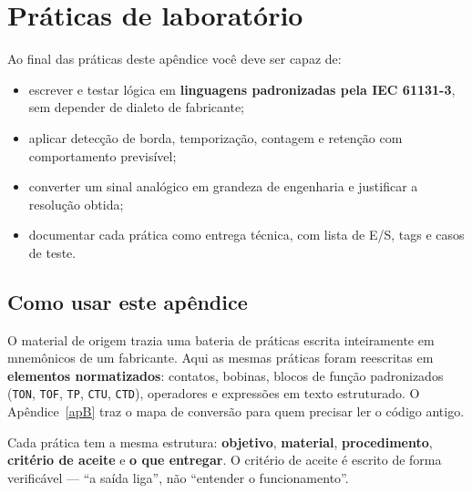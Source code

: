 \chapter{Práticas de laboratório}
\label{apA}

\begin{objetivos}
Ao final das práticas deste apêndice você deve ser capaz de:
\begin{itemize}
  \item escrever e testar lógica em \textbf{linguagens padronizadas pela IEC 61131-3}, sem depender de
        dialeto de fabricante;
  \item aplicar detecção de borda, temporização, contagem e retenção com comportamento previsível;
  \item converter um sinal analógico em grandeza de engenharia e justificar a resolução obtida;
  \item documentar cada prática como entrega técnica, com lista de E/S, tags e casos de teste.
\end{itemize}
\end{objetivos}

\section{Como usar este apêndice}

O material de origem trazia uma bateria de práticas escrita inteiramente em mnemônicos de um
fabricante. Aqui as mesmas práticas foram reescritas em \textbf{elementos normatizados}: contatos,
bobinas, blocos de função padronizados (\texttt{TON}, \texttt{TOF}, \texttt{TP}, \texttt{CTU},
\texttt{CTD}), operadores e expressões em texto estruturado. O Apêndice~\ref{apB} traz o mapa de
conversão para quem precisar ler o código antigo.

Cada prática tem a mesma estrutura: \textbf{objetivo}, \textbf{material}, \textbf{procedimento},
\textbf{critério de aceite} e \textbf{o que entregar}. O critério de aceite é escrito de forma
verificável --- ``a saída liga'', não ``entender o funcionamento''.

